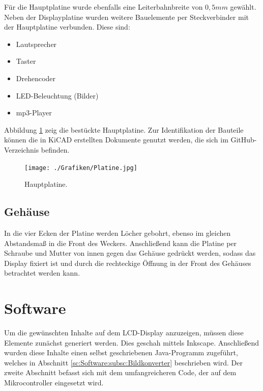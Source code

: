\documentclass[journal, a4paper]{IEEEtran}
\begin{document}
		Für die Hauptplatine wurde ebenfalls eine Leiterbahnbreite von $0,5mm$ gewählt. Neben der Displayplatine wurden weitere Bauelemente per Steckverbinder mit der Hauptplatine verbunden. Diese sind:
		\begin{itemize}
			\item Lautsprecher
			\item Taster
			\item Drehencoder
			\item LED-Beleuchtung (Bilder)
			\item mp3-Player
		\end{itemize}
		 Abbildung \ref{fig:Hauptplatine} zeig die bestückte Hauptplatine. Zur Identifikation der Bauteile können die in KiCAD erstellten Dokumente genutzt werden, die sich im GitHub-Verzeichnis befinden.
		\begin{figure}
			\begin{center}	
				\texttt{[image: ./Grafiken/Platine.jpg]}
				\caption{Hauptplatine.}
				\label{fig:Hauptplatine}
			\end{center}
		\end{figure}	
		
		\subsection{Gehäuse}
			\label{sc:Hardware:subsc:Gehäuse}
			In die vier Ecken der Platine werden Löcher gebohrt, ebenso im gleichen Abstandsmaß in die Front des Weckers. Anschließend kann die Platine per Schraube und Mutter von innen gegen das Gehäuse gedrückt werden, sodass das Display fixiert ist und durch die rechteckige Öffnung in der Front des Gehäuses betrachtet werden kann.
\section{Software}
	Um die gewünschten Inhalte auf dem LCD-Display anzuzeigen, müssen diese Elemente zunächst generiert werden. Dies geschah mittels Inkscape. Anschließend wurden diese Inhalte einen selbst geschriebenen Java-Programm zugeführt, welches in Abschnitt \ref{sc:Software:subsc:Bildkonverter} beschrieben wird. Der zweite Abschnitt befasst sich mit dem umfangreicheren Code, der auf dem Mikrocontroller eingesetzt wird.
\end{document}
